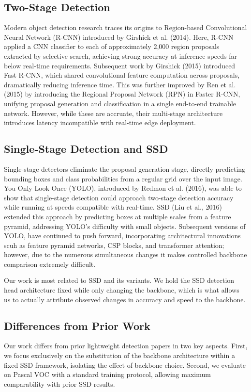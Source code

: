 \documentclass{article}
\begin{document}
\subsection{Two-Stage Detection}
\qquad Modern object detection research traces its origins to Region-based Convolutional Neural Network (R-CNN) introduced by Girshick et al. (2014). Here, R-CNN applied a CNN classifier to each of approximately 2,000 region proposals extracted by selective search, achieving strong accuracy at inference speeds far below real-time requirements. Subsequent work by Girshick (2015) introduced Fast R-CNN, which shared convolutional feature computation across proposals, dramatically reducing inference time. This was further improved by Ren et al. (2015) by introducing the Regional Proposal Network (RPN) in Faster R-CNN, unifying proposal generation and classification in a single end-to-end trainable network. However, while these are accruate, their multi-stage architecture introduces latency incompatible with real-time edge deployment. 

\subsection{Single-Stage Detection and SSD}
\qquad Single-stage detectors eliminate the proposal generation stage, directly predicting bounding boxes and class probabilities from a regular grid over the input image. You Only Look Once (YOLO), introduced by Redmon et al. (2016), was able to show that single-stage detection could approach two-stage detection accuracy while running at speeds compatible with real-time. SSD (Liu et al., 2016) extended this approach by predicting boxes at multiple scales from a feature pyramid, addressing YOLO's difficulty with small objects. Subsequent versions of YOLO, have continued to push forward, incorporating architectural innovations scuh as feature pyramid networks, CSP blocks, and transformer attention; however, due to the numerous simultaneous changes it makes controlled backbone comparison extremely difficult.

\qquad Our work is most related to SSD and its variants. We hold the SSD detection head architecture fixed while only changing the backbone, which is what allows us to actually attribute observed changes in accuracy and speed to the backbone. 

\subsection{Differences from Prior Work}
\qquad Our work differs from prior lightweight detection papers in two key aspects. First, we focus exclusively on the substitution of the backbone architecture within a fixed SSD framework, isolating the effect of backbone choice. Second, we evaluate on Pascal VOC with a standard training protocol, allowing maximum comparability with prior SSD results.  
\end{document}
